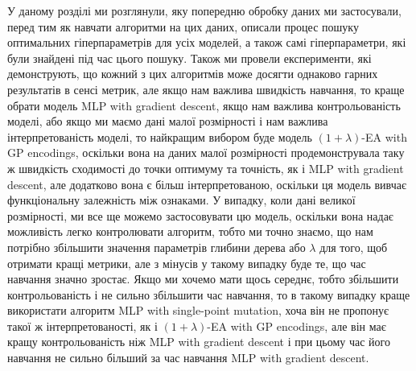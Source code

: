 \chapconclude{\ref{chap:practice}}

У даному розділі ми розглянули, яку попередню обробку даних ми застосували, перед тим як навчати алгоритми на цих даних, описали процес пошуку оптимальних гіперпараметрів для усіх моделей, а також самі гіперпараметри, які були знайдені під час цього пошуку. Також ми провели експерименти, які демонструють, що кожний з цих алгоритмів може досягти однаково гарних результатів в сенсі метрик, але якщо нам важлива швидкість навчання, то краще обрати модель MLP with gradient descent, якщо нам важлива контрольованість моделі, або якщо ми маємо дані малої розмірності і нам важлива інтерпретованість моделі, то найкращим вибором буде модель $(1+\lambda)$-EA with GP encodings, оскільки вона на даних малої розмірності продемонструвала таку ж швидкість сходимості до точки оптимуму та точність, як і MLP with gradient descent, але додатково вона є більш інтерпретованою, оскільки ця модель вивчає функціональну залежність між ознаками. У випадку, коли дані великої розмірності, ми все ще можемо застосовувати цю модель, оскільки вона надає можливість легко контролювати алгоритм, тобто ми точно знаємо, що нам потрібно збільшити значення параметрів глибини дерева або $\lambda$ для того, щоб отримати кращі метрики, але з мінусів у такому випадку буде те, що час навчання значно зростає. Якщо ми хочемо мати щось середнє, тобто збільшити контрольованість і не сильно збільшити час навчання, то в такому випадку краще використати алгоритм MLP with single-point mutation, хоча він не пропонує такої ж інтерпретованості, як і $(1+\lambda)$-EA with GP encodings, але він має кращу контрольованість ніж MLP with gradient descent і при цьому час його навчання не сильно більший за час навчання MLP with gradient descent.